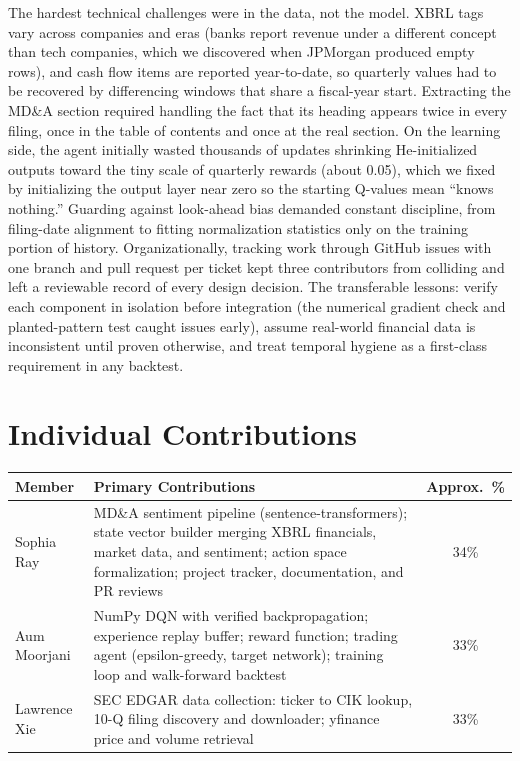 \documentclass[11pt, letterpaper]{article}
\begin{document}
The hardest technical challenges were in the data, not the model. XBRL tags vary across companies and eras (banks report revenue under a different concept than tech companies, which we discovered when JPMorgan produced empty rows), and cash flow items are reported year-to-date, so quarterly values had to be recovered by differencing windows that share a fiscal-year start. Extracting the MD\&A section required handling the fact that its heading appears twice in every filing, once in the table of contents and once at the real section. On the learning side, the agent initially wasted thousands of updates shrinking He-initialized outputs toward the tiny scale of quarterly rewards (about 0.05), which we fixed by initializing the output layer near zero so the starting Q-values mean ``knows nothing.'' Guarding against look-ahead bias demanded constant discipline, from filing-date alignment to fitting normalization statistics only on the training portion of history. Organizationally, tracking work through GitHub issues with one branch and pull request per ticket kept three contributors from colliding and left a reviewable record of every design decision. The transferable lessons: verify each component in isolation before integration (the numerical gradient check and planted-pattern test caught issues early), assume real-world financial data is inconsistent until proven otherwise, and treat temporal hygiene as a first-class requirement in any backtest.

\section{Individual Contributions}
\begin{tcolorbox}[sectionbox, height=3.5cm, valign=top]
  \vspace{4pt}
  \centering
  \begin{tabularx}{0.95\textwidth}{l X c}
    \toprule
    \textbf{Member} & \textbf{Primary Contributions} & \textbf{Approx.\ \%} \\
    \midrule
    Sophia Ray & MD\&A sentiment pipeline (sentence-transformers); state vector builder merging XBRL financials, market data, and sentiment; action space formalization; project tracker, documentation, and PR reviews & 34\% \\
    Aum Moorjani & NumPy DQN with verified backpropagation; experience replay buffer; reward function; trading agent (epsilon-greedy, target network); training loop and walk-forward backtest & 33\% \\
    Lawrence Xie & SEC EDGAR data collection: ticker to CIK lookup, 10-Q filing discovery and downloader; yfinance price and volume retrieval & 33\% \\
    \bottomrule
  \end{tabularx}
\end{tcolorbox}
\end{document}
